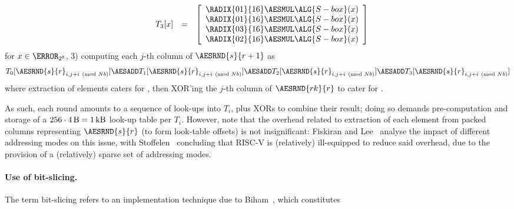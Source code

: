 \[\begin{array}{cc}
\begin{array}{lcl}
   \end{array}
   &
   \begin{array}{lcl}
   T_3[x] &=& \left[\begin{array}{c}
                    \RADIX{01}{16} \AESMUL \ALG{S-box}( x ) \\
                    \RADIX{01}{16} \AESMUL \ALG{S-box}( x ) \\
                    \RADIX{03}{16} \AESMUL \ALG{S-box}( x ) \\
                    \RADIX{02}{16} \AESMUL \ALG{S-box}( x ) \\
                    \end{array} \right]
   \end{array}
   \end{array}
   \]
   for $x \in \F_{2^8}$,
3) computing each $j$-th column of $\AESRND{s}{r+1}$ as
   \[
   T_0[ \AESRND{s}{r}_{i, j + i \pmod{Nb}} ] \AESADD
   T_1[ \AESRND{s}{r}_{i, j + i \pmod{Nb}} ] \AESADD
   T_2[ \AESRND{s}{r}_{i, j + i \pmod{Nb}} ] \AESADD
   T_3[ \AESRND{s}{r}_{i, j + i \pmod{Nb}} ]
   \]
   where extraction of elements caters for , then XOR'ing 
   the $j$-th column of $\AESRND{rk}{r}$ to cater for .

As such, each round amounts to a sequence of look-ups into $T_i$, plus XORs 
to combine their result; 
doing so demands pre-computation and storage of a
$
256 \cdot \SI{4}{\byte} = \SI{1}{\kilo\byte}
$
look-up table per $T_i$.
However, note that the overhead related to extraction of each element from 
packed columns representing $\AESRND{s}{r}$ 
(to form look-table offsets) 
is not insignificant:
Fiskiran and Lee~\cite{FisLee:01}
analyse the impact of different addressing modes on this issue, with
Stoffelen~\cite[Section 3.1]{Stoffelen:19}
concluding that RISC-V is (relatively) ill-equipped to reduce said overhead,
due to the provision of a (relatively) sparse set of addressing modes.


\paragraph{Use of bit-slicing.}

The term bit-slicing refers to an implementation technique due to
Biham~\cite{Biham:97},
which constitutes

